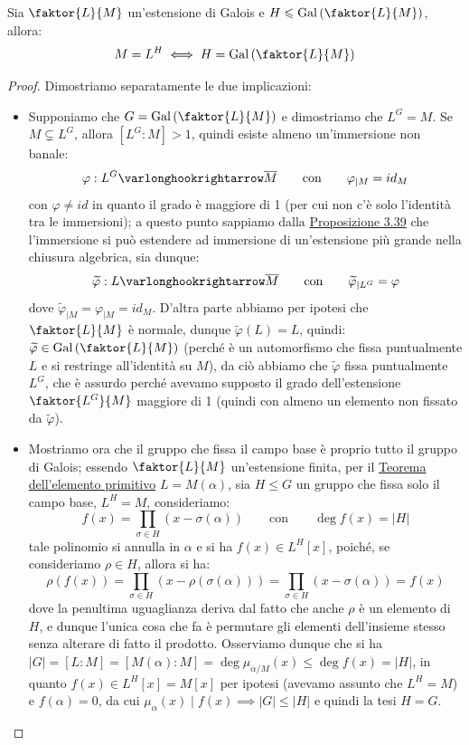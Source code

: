 \documentclass[11pt]{scrartcl}
\begin{document}
\begin{lemma}
    \label{3.66}
    Sia $\faktor{L}{M}$ un'estensione di Galois e $H \leqslant \Gal\left(\faktor{L}{M}\right)$, allora:
    \[ M = L^H \iff H = \Gal\left(\faktor{L}{M}\right)
        \]
\end{lemma}

\begin{proof}
    Dimostriamo separatamente le due implicazioni:
    \begin{itemize}
        \item Supponiamo che $G = \Gal\left(\faktor{L}{M}\right)$ e dimostriamo che $L^G = M$. Se $M \subsetneq L^G$, allora $[L^G : M]>1$, quindi esiste almeno un'immersione non banale:
        \[ \varphi : L^G \varlonghookrightarrow \ol M \qquad \text{con} \qquad \varphi_{|M} = id_M
            \]
        con $\varphi \ne id$ in quanto il grado è maggiore di 1 (per cui non c'è solo l'identità tra le immersioni); a questo punto sappiamo dalla \hyperref[3.39]{Proposizione 3.39} che l'immersione si può estendere ad 
        immersione di un'estensione più grande nella chiusura algebrica, sia dunque:
        \[ \widetilde{\varphi} : L \varlonghookrightarrow \ol M \qquad \text{con} \qquad \widetilde{\varphi}_{|L^G} = \varphi
            \]
        dove $\widetilde{\varphi}_{|M} = \varphi_{|M} = id_M$. D'altra parte abbiamo per ipotesi che $\faktor{L}{M}$ è normale, dunque $\widetilde{\varphi}(L) = L$, quindi:
        $\widetilde{\varphi} \in \Gal\left(\faktor{L}{M}\right)$ (perché è un automorfismo che fissa puntualmente $L$ e si restringe all'identità su $M$), da ciò abbiamo che $\widetilde{\varphi}$ fissa puntualmente
        $L^G$, che è assurdo perché avevamo supposto il grado dell'estensione $\faktor{L^G}{M}$ maggiore di 1 (quindi con almeno un elemento non fissato da $\widetilde{\varphi}$).
        \item Mostriamo ora che il gruppo che fissa il campo base è proprio tutto il gruppo di Galois; essendo $\faktor{L}{M}$ un'estensione finita, per il \hyperref[prim]{Teorema dell'elemento primitivo} $L = M(\alpha)$, sia $H \leqslant G$ un gruppo che fissa solo il campo base, $L^H = M$, consideriamo:
        \[ f(x) = \prod_{\sigma \in H}(x - \sigma(\alpha)) \qquad \text{con} \qquad \deg f(x) = |H|
            \]
        tale polinomio si annulla in $\alpha$ e si ha $f(x) \in L^H[x]$, poiché, se consideriamo $\rho \in H$, allora si ha:
        \[ \rho (f(x)) = \prod_{\sigma \in H}(x - \rho(\sigma(\alpha))) = \prod_{\sigma \in H}(x - \sigma(\alpha)) = f(x)
            \]
        dove la penultima uguaglianza deriva dal fatto che anche $\rho$ è un elemento di $H$, e dunque l'unica cosa che fa è permutare gli elementi dell'insieme stesso senza alterare di fatto il prodotto.
        Osserviamo dunque che si ha $|G| = [L : M] = [M(\alpha) : M] = \deg \mu_{\alpha/M}(x) \leq \deg f(x) = |H|$, in quanto $f(x) \in L^H[x] = M[x]$ per ipotesi (avevamo assunto che $L^H = M$) e $f(\alpha) = 0$, da cui $\mu_\alpha(x) \mid f(x) \implies |G| \leq |H|$ e quindi la tesi $H = G$.
    \end{itemize}
\end{proof}
\end{document}
